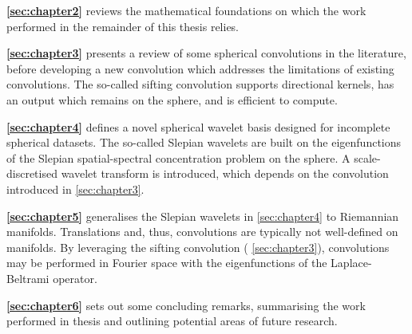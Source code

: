 \begin{hangparas}{24pt}{1}
	\textbf{\cref{sec:chapter2}} reviews the mathematical foundations on which the work performed in the remainder of this thesis relies.

	\textbf{\cref{sec:chapter3}} presents a review of some spherical convolutions in the literature, before developing a new convolution which addresses the limitations of existing convolutions.
	The so-called sifting convolution supports directional kernels, has an output which remains on the sphere, and is efficient to compute.

	\textbf{\cref{sec:chapter4}} defines a novel spherical wavelet basis designed for incomplete spherical datasets.
	The so-called Slepian wavelets are built on the eigenfunctions of the Slepian spatial-spectral concentration problem on the sphere.
	A scale-discretised wavelet transform is introduced, which depends on the convolution introduced in \cref{sec:chapter3}.

	\textbf{\cref{sec:chapter5}} generalises the Slepian wavelets in \cref{sec:chapter4} to Riemannian manifolds.
	Translations and, thus, convolutions are typically not well-defined on manifolds.
	By leveraging the sifting convolution (\cf{} \cref{sec:chapter3}), convolutions may be performed in Fourier space with the eigenfunctions of the Laplace-Beltrami operator.

	\textbf{\cref{sec:chapter6}} sets out some concluding remarks, summarising the work performed in thesis and outlining potential areas of future research.
\end{hangparas}
